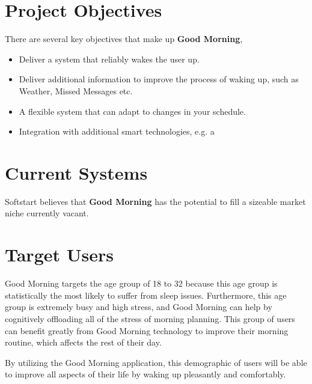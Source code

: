 \documentclass[11pt]{article}
\begin{document}

%
\section{Project Objectives}\label{project-objectives}

There are several key objectives that make up \textbf{Good Morning},

\begin{itemize}
\item
  Deliver a system that reliably wakes the user up.
\item
  Deliver additional information to improve the process of waking up, such as Weather, Missed Messages etc.
\item
  A flexible system that can adapt to changes in your schedule.
\item
  Integration with additional smart technologies, e.g. a 
\end{itemize}


%
\section{Current Systems}\label{current-systems}

Softstart believes that \textbf{Good Morning} has the potential to fill
a sizeable market niche currently vacant.


%
\section{Target Users}\label{target-users}

Good Morning targets the age group of 18 to 32 because this age group is statistically the most likely to suffer from sleep issues. Furthermore, this age group is extremely busy and high stress, and Good Morning can help by cognitively offloading all of the stress of morning planning. This group of users can benefit greatly from Good Morning technology to improve their morning routine, which affects the rest of their day.

By utilizing the Good Morning application, this demographic of users will be able to improve all aspects of their life by waking up pleasantly and comfortably.
\end{document}
